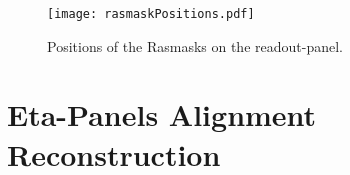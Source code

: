 \documentclass[
twoside,            %
BCOR1.4cm,          %
10pt,               %
headings=normal,    %
headsepline,        %
clearplainpage,		%
final,              %
div=14,
open=right,
bibliography=toc
]{scrreprt}
\begin{document}
\begin{figure}[!h]
	\centering
	\texttt{[image: rasmaskPositions.pdf]}
	\vspace{-2mm}
	\caption{
		Positions of the Rasmasks on the readout-panel.
	}
	\label{rasmaskPositions} 
\end{figure}

\chapter{Eta-Panels Alignment Reconstruction}\label{etaAlignment}


\end{document}
